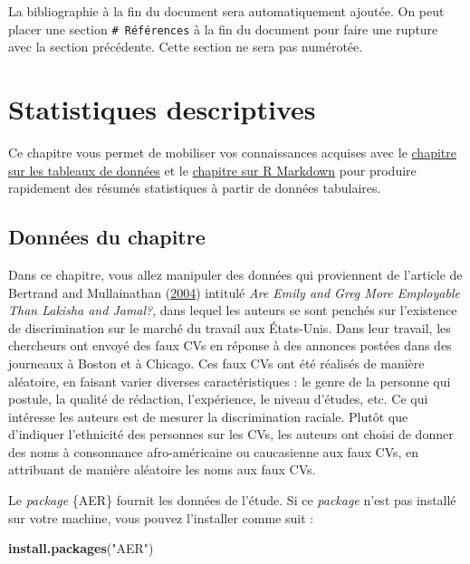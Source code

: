 \documentclass[
  11pt,
]{book}
\newenvironment{Shaded}{\begin{snugshade}}{\end{snugshade}}
\newcommand{\FunctionTok}[1]{\textcolor[rgb]{0.13,0.29,0.53}{\textbf{#1}}}
\newcommand{\NormalTok}[1]{#1}
\newcommand{\StringTok}[1]{\textcolor[rgb]{0.31,0.60,0.02}{#1}}
\numberwithin{equation}{section}
\numberwithin{countremarque}{section}
\begin{document}
La bibliographie à la fin du document sera automatiquement ajoutée. On peut placer une section \texttt{\#\ Références} à la fin du document pour faire une rupture avec la section précédente. Cette section ne sera pas numérotée.

\hypertarget{statistiques-descriptives}{%
\chapter{Statistiques descriptives}\label{statistiques-descriptives}}

Ce chapitre vous permet de mobiliser vos connaissances acquises avec le \protect\hyperlink{tableaux-de-donnuxe9es}{chapitre sur les tableaux de données} et le \protect\hyperlink{markdown}{chapitre sur R Markdown} pour produire rapidement des résumés statistiques à partir de données tabulaires.

\hypertarget{donnuxe9es-du-chapitre}{%
\section{Données du chapitre}\label{donnuxe9es-du-chapitre}}

Dans ce chapitre, vous allez manipuler des données qui proviennent de l'article de Bertrand and Mullainathan (\protect\hyperlink{ref-bertrand_2004_AER}{2004}) intitulé \emph{Are Emily and Greg More Employable Than Lakisha and Jamal?}, dans lequel les auteurs se sont penchés sur l'existence de discrimination sur le marché du travail aux États-Unis. Dans leur travail, les chercheurs ont envoyé des faux CVs en réponse à des annonces postées dans des journeaux à Boston et à Chicago. Ces faux CVs ont été réalisés de manière aléatoire, en faisant varier diverses caractéristiques : le genre de la personne qui postule, la qualité de rédaction, l'expérience, le niveau d'études, etc. Ce qui intéresse les auteurs est de mesurer la discrimination raciale. Plutôt que d'indiquer l'ethnicité des personnes sur les CVs, les auteurs ont choisi de donner des noms à consonnance afro-américaine ou caucasienne aux faux CVs, en attribuant de manière aléatoire les noms aux faux CVs.

Le \emph{package} \{AER\} fournit les données de l'étude. Si ce \emph{package} n'est pas installé sur votre machine, vous pouvez l'installer comme suit :

\begin{Shaded}
\begin{Highlighting}[]
\FunctionTok{install.packages}\NormalTok{(}\StringTok{"AER"}\NormalTok{)}
\end{Highlighting}
\end{Shaded}
\end{document}
